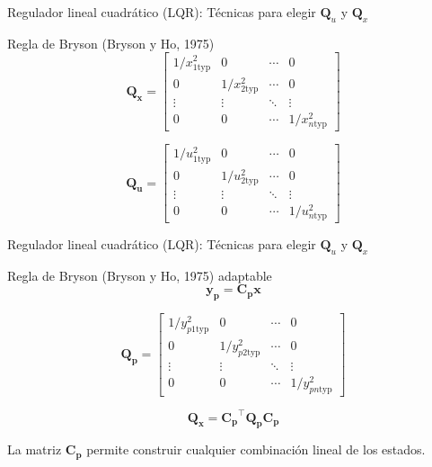 \documentclass{beamer}
\begin{document}
\begin{frame}{Regulador lineal cuadrático (LQR): Técnicas para elegir $\mathbf{Q}_u$ y $\mathbf{Q}_x$}
\begin{block}{Regla de Bryson (Bryson y Ho, 1975)}
\[
\mathbf{Q_x} = \begin{bmatrix}
1/x_{1\text{typ}}^2 & 0 & \cdots & 0 \\
0 & 1/x_{2\text{typ}}^2 & \cdots & 0 \\
\vdots & \vdots & \ddots & \vdots \\
0 & 0 & \cdots & 1/x_{n\text{typ}}^2
\end{bmatrix}
\]

\[
\mathbf{Q_u} = \begin{bmatrix}
1/u_{1\text{typ}}^2 & 0 & \cdots & 0 \\
0 & 1/u_{2\text{typ}}^2 & \cdots & 0 \\
\vdots & \vdots & \ddots & \vdots \\
0 & 0 & \cdots & 1/u_{n\text{typ}}^2
\end{bmatrix}
\]

\end{block}

\end{frame}



\begin{frame}{Regulador lineal cuadrático (LQR): Técnicas para elegir $\mathbf{Q}_u$ y $\mathbf{Q}_x$}
\begin{block}{Regla de Bryson (Bryson y Ho, 1975) adaptable}
$$\mathbf{y_p} = \mathbf{C_p} \mathbf{x}$$

$$
\mathbf{Q_p} = \begin{bmatrix}
1/y_{p1\text{typ}}^2 & 0 & \cdots & 0 \\
0 & 1/y_{p2\text{typ}}^2 & \cdots & 0 \\
\vdots & \vdots & \ddots & \vdots \\
0 & 0 & \cdots & 1/y_{pn\text{typ}}^2
\end{bmatrix}
$$

$$\mathbf{Q_x} = \mathbf{C_p}^\intercal \mathbf{Q_p} \mathbf{C_p}$$

La matriz $\mathbf{C_p}$ permite construir cualquier combinación lineal de los estados.

\end{block}

\end{frame}
\end{document}
